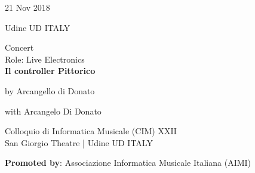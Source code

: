 \documentclass[7pt,a4paper]{article}
\begin{document}
\begin{mdframed}[
    backgroundcolor=white,
    linecolor=white,
    linewidth=0pt,
    innerleftmargin=6pt,
    innerrightmargin=6pt,
    innertopmargin=6pt,
    innerbottommargin=6pt,
    skipabove=0pt,
    skipbelow=0pt
]

\begin{minipage}[t]{0.28\textwidth}

21 Nov 2018

\scriptsize Udine UD ITALY


\end{minipage}
\begin{minipage}[t]{0.68\textwidth}
\small Concert
\\\scriptsize Role: Live Electronics
\\ \normalsize \textbf{Il controller Pittorico}
\par\scriptsize by Arcangello di Donato
\par\scriptsize with Arcangelo Di Donato
\vspace{0.25cm}



\small Colloquio di Informatica Musicale (CIM) XXII\\San Giorgio Theatre | \scriptsize Udine UD ITALY

\vspace{0.1cm}
\scriptsize

\vspace{0.1cm}
\par \textbf{Promoted by}: Associazione Informatica Musicale Italiana (AIMI)
\end{minipage}
\vspace{0.25cm}
\end{mdframed}
\end{document}
